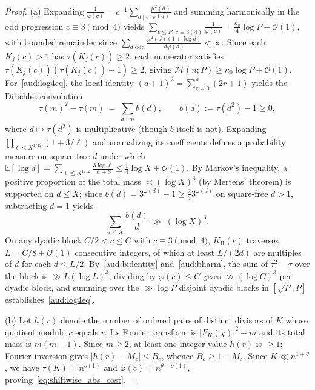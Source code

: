 \documentclass[11pt, a4paper]{article}
\theoremstyle{plain}
\theoremstyle{definition}
\newcommand{\Ebb}{\mathbb{E}}
\newcommand{\II}{\mathrm{II}}
\begin{document}
\begin{proof}
(a) Expanding $\frac{1}{\varphi(c)}=c^{-1}\sum_{d\mid c}\frac{\mu^{2}(d)}{\varphi(d)}$ and summing harmonically in the odd progression $c\equiv3\pmod 4$ yields $\sum_{c\le P,\,c\equiv3(4)}\frac{1}{\varphi(c)}=\frac{\kappa_0}{4}\log P+\mathcal{O}(1)$, with bounded remainder since $\sum_{d\text{ odd}}$\linebreak $\frac{\mu^{2}(d)(1+\log d)}{d\varphi(d)}<\infty$. Since each $K_j(c)>1$ has $\tau(K_j(c))\ge 2$, each numerator satisfies\linebreak $\tau(K_j(c))(\tau(K_j(c))-1)\ge 2$, giving $\mathcal{M}(n;P)\ge\kappa_0\log P+\mathcal{O}(1)$. For~\eqref{aud:log4eq}, the local identity $(a+1)^{2}=\sum_{r=0}^{a}(2r+1)$ yields the Dirichlet convolution
\begin{equation}\label{aud:bidentity}
\tau(m)^{2}-\tau(m)\ =\ \sum_{d\mid m}b(d),\qquad b(d):=\tau(d^{2})-1\ge0,
\end{equation}
where $d\mapsto\tau(d^{2})$ is multiplicative (though $b$ itself is not). Expanding $\prod_{\ell\le X^{1/12}}(1+3/\ell)$ and normalizing its coefficients defines a probability measure on square-free $d$ under which $\Ebb[\log d]=\sum_{\ell\le X^{1/12}}\frac{3\log\ell}{\ell+3}\le\frac14\log X+\mathcal{O}(1)$. By Markov's inequality, a positive proportion of the total mass $\asymp(\log X)^{3}$ (by Mertens' theorem) is supported on $d\le X$; since $b(d)=3^{\omega(d)}-1\ge\frac23 3^{\omega(d)}$ on square-free $d>1$, subtracting $d=1$ yields
\begin{equation}\label{aud:bharm}
\sum_{d\le X}\frac{b(d)}{d}\ \gg\ (\log X)^{3}.
\end{equation}
On any dyadic block $C/2<c\le C$ with $c\equiv3\pmod 4$, $K_{\II}(c)$ traverses $L=C/8+\mathcal{O}(1)$ consecutive integers, of which at least $L/(2d)$ are multiples of $d$ for each $d\le L/2$. By~\eqref{aud:bidentity} and~\eqref{aud:bharm}, the sum of $\tau^{2}-\tau$ over the block is $\gg L(\log L)^{3}$; dividing by $\varphi(c)\le C$ gives $\gg(\log C)^{3}$ per dyadic block, and summing over the $\gg\log P$ disjoint dyadic blocks in $[\sqrt{P},P]$ establishes~\eqref{aud:log4eq}.

(b) Let $h(r)$ denote the number of ordered pairs of distinct divisors of $K$ whose quotient modulo $c$ equals $r$. Its Fourier transform is $|F_K(\chi)|^{2}-m$ and its total mass is $m(m-1)$. Since $m\ge 2$, at least one integer value $h(r)$ is $\ge 1$; Fourier inversion gives $|h(r)-M_c|\le B_c$, whence $B_c\ge 1-M_c$. Since $K\ll n^{1+\theta}$, we have $\tau(K)=n^{o(1)}$ and $\varphi(c)=n^{\theta-o(1)}$, proving~\eqref{eq:shiftwise_abs_cost}.


\end{proof}
\end{document}
